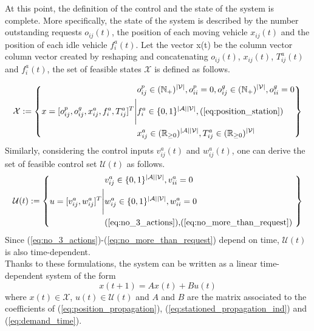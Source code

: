 At this point, the definition of the control and the state of the system is complete. More specifically, the state of the system is described by the number outstanding requests $o_{ij}(t)$, the position of each moving vehicle $x_{ij}(t)$ and the position of each idle vehicle $f^a_{i}(t)$. Let the vector x(t) be the column vector column vector created by reshaping and concatenating $o_{ij}(t)$, $x_{ij}(t)$, $T_{ij}^a(t)$ and $f^a_{i}(t)$, the set of feasible states $\mathcal{X}$ is defined as follows. 

\begin{equation}
	\mathcal{X} := \left\{
	\begin{aligned}
		& o^p_{ij} \in (\mathbb{N}_+)^{|\mathcal{V}|},o^p_{ii} = 0, o^g_{ij} \in (\mathbb{N}_+)^{|\mathcal{V}|},o^g_{ii} = 0   \\
		 x = [o^p_{ij},o^g_{ij}, x_{ij}^a, f^a_{i}, T_{ij}^a]^T \Bigg| &f^a_{i} \in \{0,1\}^{|\mathcal{A}||\mathcal{V}|}, \text{(\ref{eq:position_station})} \\
		&  x_{ij}^a\in (\mathbb{R}_{\ge 0})^{|\mathcal{A}||\mathcal{V}|}, T^a_{ij} \in (\mathbb{R}_{\ge 0})^{|\mathcal{V}|} \\
	\end{aligned}
	\right\}
\end{equation}
Similarly, considering the control inputs $v^{a}_{ij}(t)$ and $w^{a}_{ij}(t)$, one can derive the set of feasible control set $\mathcal{U}(t)$ as follows. 
\begin{equation}
	\mathcal{\mathcal{U}}(t) := \left\{
	\begin{aligned}
		&v^a_{ij} \in \{0,1\}^{|\mathcal{A}||\mathcal{V}|}, v^a_{ii} = 0 \\
		u = [v^{a}_{ij}, w^{a}_{ij}]^T \Bigg|&w^a_{ij} \in \{0,1\}^{|\mathcal{A}||\mathcal{V}|},w^a_{ii} = 0 \\ 
		&\text{(\ref{eq:no_3_actions}),(\ref{eq:no_more_than_request})
		} \\
	\end{aligned}
	\right\}
\end{equation}
Since (\ref{eq:no_3_actions})-(\ref{eq:no_more_than_request}) depend on time, $\mathcal{U}(t)$ is also time-dependent. \\
Thanks to these formulations, the system can be written as a linear time-dependent system of the form
\begin{equation}
	x(t+1) = Ax(t) + Bu(t)\label{eq:normal_system}
\end{equation}
where $x(t) \in \mathcal{X}$, $u(t) \in \mathcal{U}(t)$ and $A$ and $B$ are the matrix associated to the coefficients of (\ref{eq:position_propagation}), (\ref{eq:stationed_propagation_ind}) and (\ref{eq:demand_time}). \\
